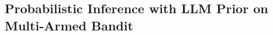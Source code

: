 \documentclass{article} %
\theoremstyle{plain}
\theoremstyle{definition}
\theoremstyle{remark}
\begin{document}
{%

\iffalse
\subsection{Probabilistic Inference with LLM Prior on Multi-Armed Bandit}

}
\end{document}
